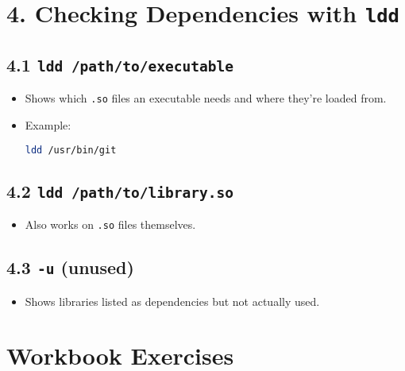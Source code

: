 \documentclass[12pt,a4paper]{report}
\begin{document}
 

\section*{4. Checking Dependencies with \texttt{ldd}}

\subsection*{4.1 \texttt{ldd /path/to/executable}}
\begin{itemize}
    \item Shows which \texttt{.so} files an executable needs and where they’re loaded from.  
    \item Example:
    \begin{lstlisting}[language=bash]
    ldd /usr/bin/git
    \end{lstlisting}
\end{itemize}

\subsection*{4.2 \texttt{ldd /path/to/library.so}}
\begin{itemize}
    \item Also works on \texttt{.so} files themselves.
\end{itemize}

\subsection*{4.3 \texttt{-u} (unused)}
\begin{itemize}
    \item Shows libraries listed as dependencies but not actually used.
\end{itemize}

 

\section*{Workbook Exercises}
\end{document}
